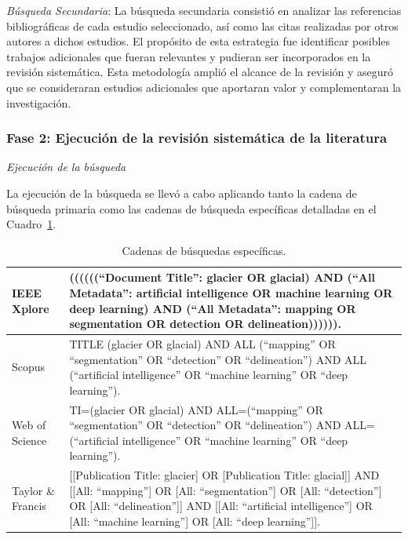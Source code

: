 \textit{Búsqueda Secundaria}: La búsqueda secundaria consistió en analizar las referencias bibliográficas de cada estudio seleccionado, así como las citas realizadas por otros autores a dichos estudios. El propósito de esta estrategia fue identificar posibles trabajos adicionales que fueran relevantes y pudieran ser incorporados en la revisión sistemática. Esta metodología amplió el alcance de la revisión y aseguró que se consideraran estudios adicionales que aportaran valor y complementaran la investigación.

\subsubsection{Fase 2: Ejecución de la revisión sistemática de la literatura}

\textit{Ejecución de la búsqueda}

La ejecución de la búsqueda se llevó a cabo aplicando tanto la cadena de búsqueda primaria como las cadenas de búsqueda específicas detalladas en el Cuadro~\ref{tab:CadenasBusquedaEspecifica}.

\begin{table}[H]
\small
\caption{Cadenas de búsquedas específicas.\label{tab:CadenasBusquedaEspecifica}}
\begin{tabularx}{\textwidth}{lX}
\hline
IEEE Xplore & ((((((``Document Title'': glacier OR glacial) AND (``All Metadata'': artificial intelligence OR machine learning OR deep learning) AND (``All Metadata'': mapping OR segmentation OR detection OR delineation)))))). \\\hline
Scopus & TITLE (glacier OR glacial) AND ALL (``mapping'' OR ``segmentation'' OR ``detection'' OR ``delineation'') AND ALL (``artificial intelligence'' OR ``machine learning'' OR ``deep learning''). \\\hline
Web of Science & TI=(glacier OR glacial) AND ALL=(``mapping'' OR ``segmentation'' OR ``detection'' OR ``delineation'') AND ALL=(``artificial intelligence'' OR ``machine learning'' OR ``deep learning''). \\\hline
Taylor \& Francis & [[Publication Title: glacier] OR [Publication Title: glacial]] AND [[All: ``mapping''] OR [All: ``segmentation''] OR [All: ``detection''] OR [All: ``delineation'']] AND [[All: ``artificial intelligence''] OR [All: ``machine learning''] OR [All: ``deep learning'']]. \\
\hline
\end{tabularx}
\end{table}

